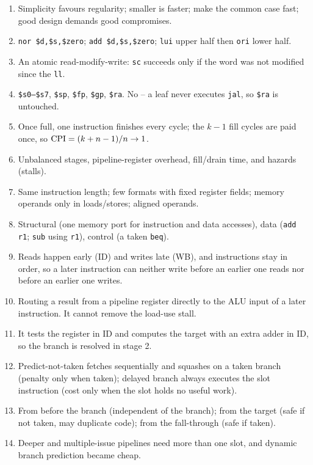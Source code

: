 \documentclass[11pt]{article}
\begin{document}
\begin{enumerate}[label=\textbf{A\arabic*.},leftmargin=*]
  delayed branches/loads).
  \item Simplicity favours regularity; smaller is faster; make the common
  case fast; good design demands good compromises.
  \item \texttt{nor \$d,\$s,\$zero}; \texttt{add \$d,\$s,\$zero};
  \texttt{lui} upper half then \texttt{ori} lower half.
  \item An atomic read-modify-write: \texttt{sc} succeeds only if the word was
  not modified since the \texttt{ll}.
  \item \texttt{\$s0--\$s7}, \texttt{\$sp}, \texttt{\$fp}, \texttt{\$gp},
  \texttt{\$ra}. No -- a leaf never executes \texttt{jal}, so \texttt{\$ra} is
  untouched.
  \item Once full, one instruction finishes every cycle; the $k-1$ fill cycles
  are paid once, so $\mathrm{CPI}=(k+n-1)/n\to1$.
  \item Unbalanced stages, pipeline-register overhead, fill/drain time, and
  hazards (stalls).
  \item Same instruction length; few formats with fixed register fields;
  memory operands only in loads/stores; aligned operands.
  \item Structural (one memory port for instruction and data accesses), data
  (\texttt{add r1}; \texttt{sub} using \texttt{r1}), control (a taken
  \texttt{beq}).
  \item Reads happen early (ID) and writes late (WB), and instructions stay in
  order, so a later instruction can neither write before an earlier one reads
  nor before an earlier one writes.
  \item Routing a result from a pipeline register directly to the ALU input
  of a later instruction. It cannot remove the load-use stall.
  \item It tests the register in ID and computes the target with an extra
  adder in ID, so the branch is resolved in stage 2.
  \item Predict-not-taken fetches sequentially and squashes on a taken branch
  (penalty only when taken); delayed branch always executes the slot
  instruction (cost only when the slot holds no useful work).
  \item From before the branch (independent of the branch); from the target
  (safe if not taken, may duplicate code); from the fall-through (safe if
  taken).
  \item Deeper and multiple-issue pipelines need more than one slot, and
  dynamic branch prediction became cheap.
\end{enumerate}
\end{document}
